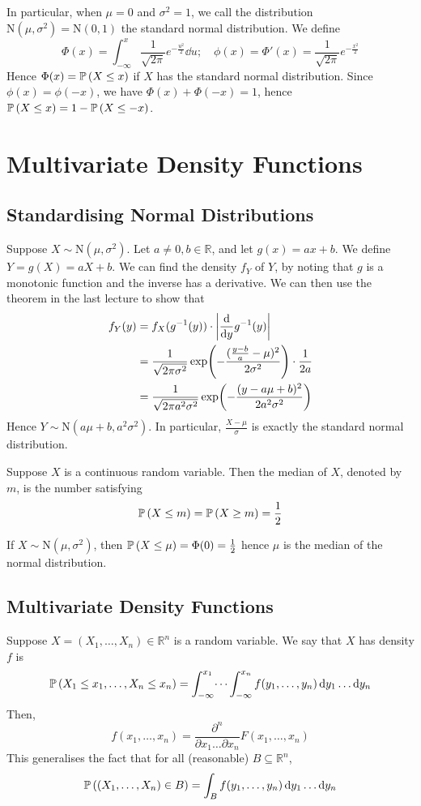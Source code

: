\documentclass{article}
\begin{document}
In particular, when $\mu = 0$ and $\sigma^2 = 1$, we call the distribution $\mathrm{N}(\mu, \sigma^2) = \mathrm{N}(0, 1)$ the standard normal distribution. We define
\[ \Phi(x) = \int_{-\infty}^x \frac{1}{\sqrt{2\pi}} e^{-\frac{u^2}{2}} \dd{u};\quad \phi(x) = \Phi'(x) = \frac{1}{\sqrt{2\pi}} e^{-\frac{x^2}{2}} \]
Hence $\Phi(x) = \mathbb{P}\left({X \leq x}\right)$ if $X$ has the standard normal distribution. Since $\phi(x) = \phi(-x)$, we have $\Phi(x) + \Phi(-x) = 1$, hence $\mathbb{P}\left({X \leq x}\right) = 1 - \mathbb{P}\left({X \leq -x}\right)$.

\section{Multivariate Density Functions}
\subsection{Standardising Normal Distributions}
Suppose $X \sim \mathrm{N}(\mu, \sigma^2)$. Let $a \neq 0, b \in \mathbb R$, and let $g(x) = ax+b$. We define $Y = g(X) = aX+b$. We can find the density $f_Y$ of $Y$, by noting that $g$ is a monotonic function and the inverse has a derivative. We can then use the theorem in the last lecture to show that
\begin{align*}
	f_Y(y) & = f_X(g^{-1}(y)) \cdot \abs{\dv{y} g^{-1}(y)}                                                       \\
	       & = \frac{1}{\sqrt{2\pi\sigma^2}} \exp(-\frac{(\frac{y-b}{a} - \mu)^2}{2\sigma^2}) \cdot \frac{1}{2a} \\
	       & =\frac{1}{\sqrt{2\pi a^2\sigma^2}} \exp(-\frac{(y - a\mu + b)^2}{2 a^2 \sigma^2})
\end{align*}
Hence $Y \sim \mathrm{N}(a \mu + b, a^2 \sigma^2)$. In particular, $\frac{X-\mu}{\sigma}$ is exactly the standard normal distribution.
\begin{definition}
	Suppose $X$ is a continuous random variable. Then the median of $X$, denoted by $m$, is the number satisfying
	\[ \mathbb{P}\left({X \leq m}\right) = \mathbb{P}\left({X \geq m}\right) = \frac{1}{2} \]
\end{definition}
\noindent If $X \sim \mathrm{N}(\mu, \sigma^2)$, then $\mathbb{P}\left({X \leq \mu}\right) = \Phi(0) = \frac{1}{2}$ hence $\mu$ is the median of the normal distribution.

\subsection{Multivariate Density Functions}
Suppose $X = (X_1, \dots, X_n) \in \mathbb R^n$ is a random variable. We say that $X$ has density $f$ is
\[ \mathbb{P}\left({X_1 \leq x_1, \dots, X_n \leq x_n}\right) = \int_{-\infty}^{x_1} \dots \int_{-\infty}^{x_n}  f(y_1, \dots, y_n) \dd{y_1} \dots \dd{y_n} \]
Then,
\[ f(x_1, \dots, x_n) = \frac{\partial^n}{\partial x_1 \dots \partial x_n} F(x_1, \dots, x_n) \]
This generalises the fact that for all (reasonable) $B \subseteq \mathbb R^n$,
\[ \mathbb{P}\left({(X_1, \dots, X_n) \in B}\right) = \int_B f(y_1, \dots, y_n) \dd{y_1}\dots\dd{y_n} \]
\end{document}
